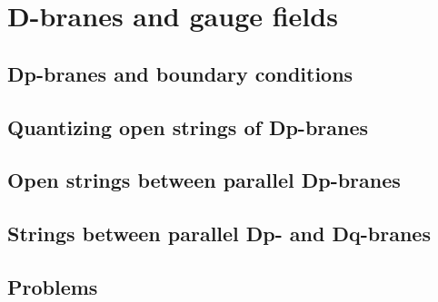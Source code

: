 \documentclass[12pt]{report}
\begin{document}
\chapter{D-branes and gauge fields}
\newpage
\section{Dp-branes and boundary conditions}
\section{Quantizing open strings of Dp-branes}
\section{Open strings between parallel Dp-branes}
\section{Strings between parallel Dp- and Dq-branes}
\section{Problems}
\end{document}
